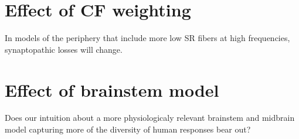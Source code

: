 \section{Effect of CF weighting} %
\label{sec:effect_of_cf_weighting}
In models of the periphery that include more low SR fibers at high frequencies, synaptopathic losses will change.

\section{Effect of brainstem model} %
\label{sec:effect_of_brainstem_model}
Does our intuition about a more physiologicaly relevant brainstem and midbrain model capturing more of the diversity of human responses bear out? 
